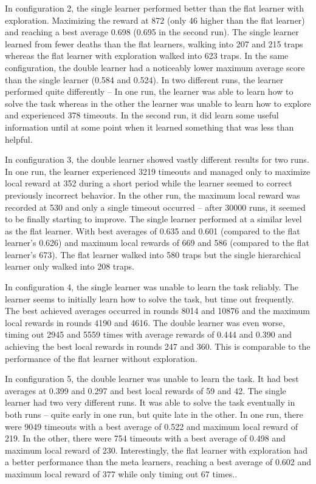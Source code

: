 \documentclass{article}
\begin{document}
	In configuration 2, the single learner performed better than the flat learner with exploration. Maximizing the reward at 872 (only 46 higher than the flat learner) and reaching a best average 0.698 (0.695 in the second run). The single learner learned from fewer deaths than the flat learners, walking into 207 and 215 traps whereas the flat learner with exploration walked into 623 traps. 
	In the same configuration, the double learner had a noticeably lower maximum average score than the single learner (0.584 and 0.524). In two different runs, the learner performed quite differently -- In one run, the learner was able to learn how to solve the task whereas in the other the learner was unable to learn how to explore and experienced 378 timeouts. In the second run, it did learn some useful information until at some point when it learned something that was less than helpful.

	In configuration 3, the double learner showed vastly different results for two runs. In one run, the learner experienced 3219 timeouts and managed only to maximize local reward at 352 during a short period while the learner seemed to correct previously incorrect behavior. In the other run, the maximum local reward was recorded at 530 and only a single timeout occurred -- after 30000 runs, it seemed to be finally starting to improve. 
	The single learner performed at a similar level as the flat learner. With best averages of 0.635 and 0.601 (compared to the flat learner's 0.626) and maximum local rewards of 669 and 586 (compared to the flat learner's 673). The flat learner walked into 580 traps but the single hierarchical learner only walked into 208 traps.

	In configuration 4, the single learner was unable to learn the task reliably. The learner seems to initially learn how to solve the task, but time out frequently. The best achieved averages occurred in rounds 8014 and 10876 and the maximum local rewards in rounds 4190 and 4616.
	The double learner was even worse, timing out 2945 and 5559 times with average rewards of 0.444 and 0.390 and achieving the best local rewards in rounds 247 and 360. This is comparable to the performance of the flat learner without exploration.

	In configuration 5, the double learner was unable to learn the task. It had best averages at 0.399 and 0.297 and best local rewards of 59 and 42. The single learner had two very different runs. It was able to solve the task eventually in both runs -- quite early in one run, but quite late in the other. In one run, there were 9049 timeouts with a best average of 0.522 and maximum local reward of 219. In the other, there were 754 timeouts with a best average of 0.498 and maximum local reward of 230. Interestingly, the flat learner with exploration had a better performance than the meta learners, reaching a best average of 0.602 and maximum local reward of 377 while only timing out 67 times..
\end{document}
